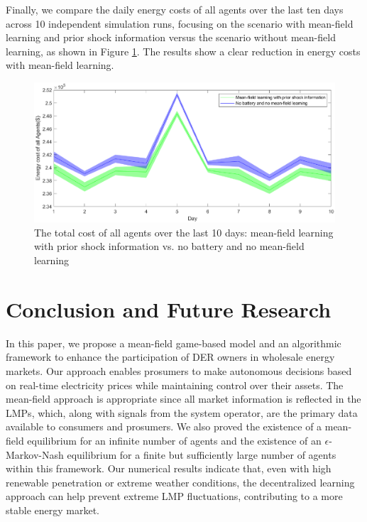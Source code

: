 \documentclass{article}
\theoremstyle{definition}
\theoremstyle{plain}
\begin{document}
Finally, we compare the daily energy costs of all agents over the last ten days across 10 independent simulation runs, focusing on the scenario with mean-field learning and prior shock information versus the scenario without mean-field learning, as shown in Figure \ref{fig:energy_cost}. The results show a clear reduction in energy costs with mean-field learning.
\begin{figure}[!h]
   \centering
    \includegraphics[width=\textwidth]{energy_cost.eps}
    \caption{The total cost of all agents over the last 10 days: mean-field learning with prior shock information vs. no battery and no mean-field learning}
    \label{fig:energy_cost}
\end{figure}


\section{Conclusion and Future Research}
\label{sec:concl}

In this paper, we propose a mean-field game-based model and an algorithmic framework to enhance the participation of DER owners in wholesale energy markets. Our approach enables prosumers to make autonomous decisions based on real-time electricity prices while maintaining control over their assets. The mean-field approach is appropriate since all market information is reflected in the LMPs, which, along with signals from the system operator, are the primary data available to consumers and prosumers. We also proved the existence of a mean-field equilibrium for an infinite number of agents and the existence of an $\epsilon$-Markov-Nash equilibrium for a finite but sufficiently large number of agents within this framework. Our numerical results indicate that, even with high renewable penetration or extreme weather conditions, the decentralized learning approach can help prevent extreme LMP fluctuations, contributing to a more stable energy market.
\end{document}
